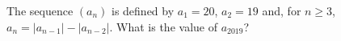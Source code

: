 The sequence $(a_n)$ is defined by $a_1=20$, $a_2=19$ and, for $n\ge3$, $a_n=|a_{n-1}|-|a_{n-2}|$. What is the value of $a_{2019}$?
